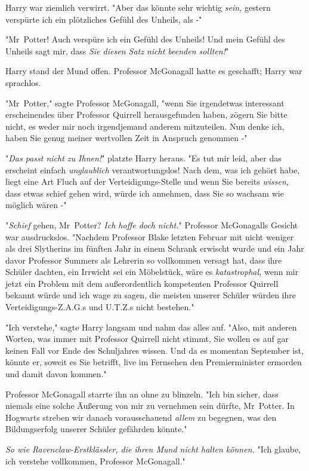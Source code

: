 {Harry war ziemlich verwirrt. "Aber das könnte sehr wichtig \emph{sein,} gestern verspürte ich ein plötzliches Gefühl des Unheils, als -"

"Mr~Potter! Auch verspüre ich ein Gefühl des Unheils! Und mein Gefühl des Unheils sagt mir, dass \emph{Sie diesen Satz nicht beenden sollten!}"

Harry stand der Mund offen. Professor McGonagall hatte es geschafft; Harry war sprachlos.

"Mr~Potter," sagte Professor McGonagall, "wenn Sie irgendetwas interessant erscheinendes über Professor Quirrell herausgefunden haben, zögern Sie bitte nicht, es weder mir noch irgendjemand anderem mitzuteilen. Nun denke ich, haben Sie genug meiner wertvollen Zeit in Anspruch genommen -"

"\emph{Das passt nicht zu Ihnen!}" platzte Harry heraus. "Es tut mir leid, aber das erscheint einfach \emph{unglaublich} verantwortungslos! Nach dem, was ich gehört habe, liegt eine Art Fluch auf der Verteidigungs-Stelle und wenn Sie bereits \emph{wissen,} dass etwas schief gehen wird, würde ich annehmen, dass Sie so wachsam wie möglich wären -"

"\emph{Schief} gehen, Mr~Potter? \emph{Ich hoffe doch nicht.}" Professor McGonagalls Gesicht war ausdruckslos. "Nachdem Professor Blake letzten Februar mit nicht weniger als drei Slytherins im fünften Jahr in einem Schrank erwischt wurde und ein Jahr davor Professor Summers als Lehrerin so vollkommen versagt hat, dass ihre Schüler dachten, ein Irrwicht sei ein Möbelstück, wäre es \emph{katastrophal,} wenn mir jetzt ein Problem mit dem außerordentlich kompetenten Professor Quirrell bekannt würde und ich wage zu sagen, die meisten unserer Schüler würden ihre Verteidigungs-Z.A.G.s und U.T.Z.s nicht bestehen."

"Ich verstehe," sagte Harry langsam und nahm das alles auf. "Also, mit anderen Worten, was immer mit Professor Quirrell nicht stimmt, Sie wollen es auf gar keinen Fall vor Ende des Schuljahres wissen. Und da es momentan September ist, könnte er, soweit es Sie betrifft, live im Fernsehen den Premierminister ermorden und damit davon kommen."

Professor McGonagall starrte ihn an ohne zu blinzeln. "Ich bin sicher, dass niemals eine solche Äußerung von mir zu vernehmen sein dürfte, Mr~Potter. In Hogwarts streben wir danach vorausschauend \emph{allem} zu begegnen, was den Bildungserfolg unserer Schüler gefährden könnte."

\emph{So wie Ravenclaw-Erstklässler, die ihren Mund nicht halten können.} "Ich glaube, ich verstehe vollkommen, Professor McGonagall."

}
